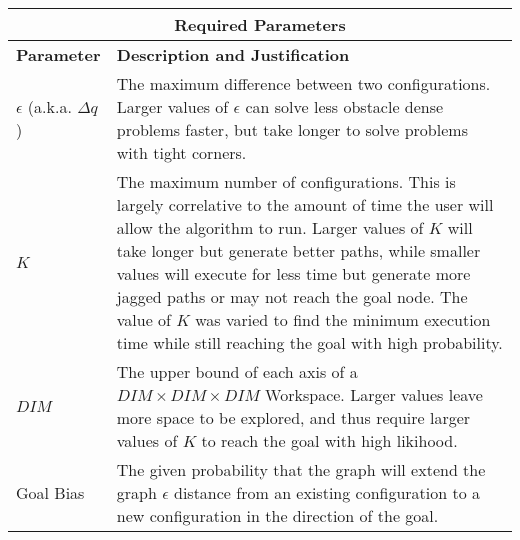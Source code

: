 \begin{table}[H]
\begin{center}
\begin{tabular}{|p{.2\linewidth}|p{.74\linewidth}|}
    \hline
    \multicolumn{2}{|c|}{\textbf{Required Parameters}} \\
    \hline
    \textbf{Parameter}   & \textbf{Description and Justification} \\
    \hline
    $\epsilon$ (a.k.a. $\Delta q$) & 
        The maximum difference between two configurations. Larger values of $\epsilon$ can solve less obstacle dense problems faster, but take longer to solve problems with tight corners.\\
    \hline
    $K$ &
        The maximum number of configurations. This is largely correlative to the amount of time the user will allow the algorithm to run. Larger values of $K$ will take longer but generate better paths, while smaller values will execute for less time but generate more jagged paths or may not reach the goal node. The value of $K$ was varied to find the minimum execution time while still reaching the goal with high probability. \\
    \hline
    $DIM$ &
        The upper bound of each axis of a $DIM\times DIM\times DIM$ Workspace. Larger values leave more space to be explored, and thus require larger values of $K$ to reach the goal with high likihood. \\
    \hline
    Goal Bias &
        The given probability that the graph will extend the graph $\epsilon$ distance from an existing configuration to a new configuration in the direction of the goal. \\
    \hline
\end{tabular}
\label{table:RRT_Tech_Specs_Parameters}
\end{center}
\end{table}